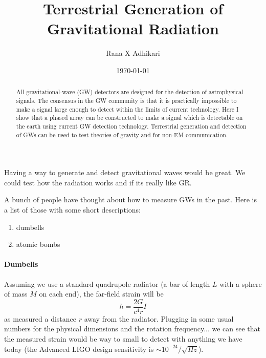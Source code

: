 \documentclass[aps,prl,twocolumn,showpacs,superscriptaddress,groupedaddress]{revtex4-1}  %
\begin{document}
\newcommand{\R}[1]{\textcolor{BrickRed}{#1}}
\newcommand{\B}[1]{\textcolor{blue}{#1}}

\title{Terrestrial Generation of Gravitational Radiation}
\author{Rana X Adhikari}
\date{\today}


\begin{abstract}
All gravitational-wave (GW) detectors are designed for the detection of astrophysical
signals. The consensus in the GW community is that it is practically impossible to make a signal large enough to detect within the limits of current technology. Here I show that a phased array can be constructed to make a signal which is detectable on the earth using current GW detection technology. Terrestrial generation and detection of GWs can be used to test theories of gravity and for non-EM communication.
\end{abstract}

\pacs{}
\maketitle

Having a way to generate and detect gravitational waves would be great.
We could test how the radiation works and if its really like GR.

A bunch of people have thought about how to measure GWs in the past. Here is
a list of those with some short descriptions:
\begin{enumerate}
\item dumbells
\item atomic bombs
\end{enumerate}

\paragraph{Dumbells}
Assuming we use a standard quadrupole radiator (a bar of length $L$ with
a sphere of mass $M$ on each end), the far-field strain will be
\begin{equation}
h = \frac{2 G}{c^4 r} \ddot{I}
\end{equation}
as measured a distance $r$ away from the radiator.
Plugging in some usual numbers for the physical dimensions and the rotation
frequency...
we can see that the measured strain would be way to small to detect with
anything we have today (the Advanced LIGO design sensitivity is
$\sim 10^{-24} / \sqrt{Hz}$).
\end{document}
